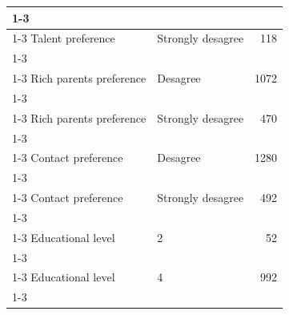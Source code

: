 \documentclass[
  spanish,
  a4paper,
  oneside]{scrbook}
\begin{document}
\begin{table}
{\begin{tabular}[t]{llr}
\cmidrule{1-3}
\hspace{1em}\cellcolor{gray!10}{Talent preference} & \cellcolor{gray!10}{Strongly agree} & \cellcolor{gray!10}{942}\\
\cmidrule{1-3}
\hspace{1em}Talent preference & Strongly desagree & 118\\
\cmidrule{1-3}
\hspace{1em}\cellcolor{gray!10}{Rich parents preference} & \cellcolor{gray!10}{Agree} & \cellcolor{gray!10}{1322}\\
\cmidrule{1-3}
\hspace{1em}Rich parents preference & Desagree & 1072\\
\cmidrule{1-3}
\hspace{1em}\cellcolor{gray!10}{Rich parents preference} & \cellcolor{gray!10}{Strongly agree} & \cellcolor{gray!10}{228}\\
\cmidrule{1-3}
\hspace{1em}Rich parents preference & Strongly desagree & 470\\
\cmidrule{1-3}
\hspace{1em}\cellcolor{gray!10}{Contact preference} & \cellcolor{gray!10}{Agree} & \cellcolor{gray!10}{1168}\\
\cmidrule{1-3}
\hspace{1em}Contact preference & Desagree & 1280\\
\cmidrule{1-3}
\hspace{1em}\cellcolor{gray!10}{Contact preference} & \cellcolor{gray!10}{Strongly agree} & \cellcolor{gray!10}{239}\\
\cmidrule{1-3}
\hspace{1em}Contact preference & Strongly desagree & 492\\
\cmidrule{1-3}
\hspace{1em}\cellcolor{gray!10}{Educational level} & \cellcolor{gray!10}{1} & \cellcolor{gray!10}{12}\\
\cmidrule{1-3}
\hspace{1em}Educational level & 2 & 52\\
\cmidrule{1-3}
\hspace{1em}\cellcolor{gray!10}{Educational level} & \cellcolor{gray!10}{3} & \cellcolor{gray!10}{125}\\
\cmidrule{1-3}
\hspace{1em}Educational level & 4 & 992\\
\cmidrule{1-3}
\hspace{1em}\cellcolor{gray!10}{Educational level} & \cellcolor{gray!10}{5} & \cellcolor{gray!10}{298}\\

\end{tabular}}
\end{table}
\end{document}
